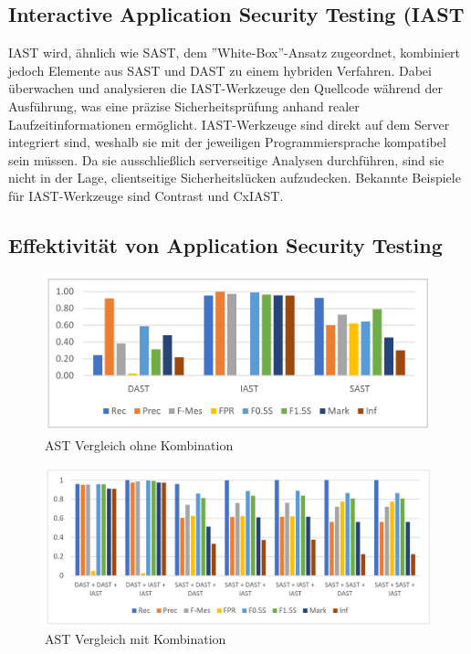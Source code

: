 \documentclass[acmtog]{acmart}
\begin{document}
\subsection{Interactive Application Security Testing (IAST}
IAST wird, ähnlich wie SAST, dem ''White-Box''-Ansatz zugeordnet, kombiniert jedoch Elemente aus SAST und DAST zu einem hybriden Verfahren. 
Dabei überwachen und analysieren die IAST-Werkzeuge den Quellcode während der Ausführung, was eine präzise Sicherheitsprüfung anhand realer Laufzeitinformationen ermöglicht. 
IAST-Werkzeuge sind direkt auf dem Server integriert sind, weshalb sie mit der jeweiligen Programmiersprache kompatibel sein müssen. 
Da sie ausschließlich serverseitige Analysen durchführen, sind sie nicht in der Lage, clientseitige Sicherheitslücken aufzudecken. Bekannte Beispiele für IAST-Werkzeuge sind Contrast und CxIAST. \cite{mateo_tudela_combining_2020}



\subsection{Effektivität von Application Security Testing}

\begin{figure}[H]
	\centering
	\includegraphics[width=0.9\linewidth]{images/AST_Comparison.png}
	\caption{AST Vergleich ohne Kombination}
	\label{fig:astCompare}
\end{figure}


\begin{figure}[H]
	\centering
	\includegraphics[width=0.9\linewidth]{images/AST_Comparison_Combination.png}
	\caption{AST Vergleich mit Kombination}
	\label{fig:astCompareCompination}
\end{figure}
\end{document}
